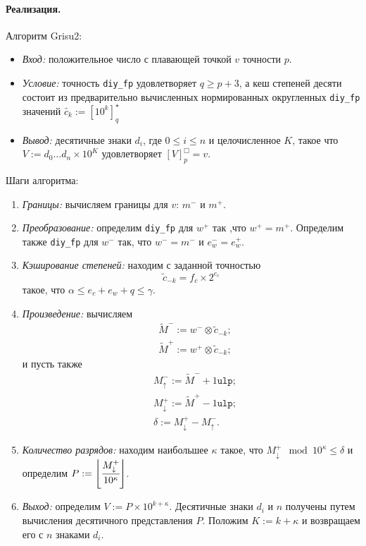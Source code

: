 \documentclass[specialist,subf,href,colorlinks=true,14pt
,times,mtpro,specialist
]{disser}
\begin{document}
\paragraph{Реализация.}
Алгоритм \textsf{Grisu2}: \begin{itemize}
\item \textit{Вход:} положительное число с плавающей точкой $v$ точности $p$.
\item \textit{Условие:} точность \texttt{diy\_fp} удовлетворяет $q \geqslant p + 3$, а кеш степеней десяти состоит из предварительно вычисленных нормированных округленных  \texttt{diy\_fp} значений $\tilde{c_k} := \left[ 10^k \right]_q^{\star}$
\item \textit{Вывод:} десятичные знаки $d_i$, где $0 \leqslant i \leqslant n$ и целочисленное $K$, такое что $V:=d_0\dots d_n \times 10 ^K$ удовлетворяет $[V]^{\Box}_p = v$. 
\end{itemize}

Шаги алгоритма:
\begin{enumerate}
\item \textit{Границы:} вычисляем границы для $v$: $m^{-}$ и $m^{+}$. 
\item \textit{Преобразование:} определим \texttt{diy\_fp} для $w^+$ так ,что $w^+ = m^+$. 
Определим также \texttt{diy\_fp} для $w^-$ так, что $w^{-} = m^-$ и $e_w^- = e_w^+$.
\item \textit{Кэширование степеней:} находим с заданной точностью $$\tilde{c}_{-k} = f_c \times 2^{e_c}$$ такое, что $\alpha \leqslant e_c + e_w + q \leqslant \gamma$.
\item \textit{Произведение:} вычисляем \begin{align*}
&\tilde{M}^- := w^- \otimes \tilde{c}_{-k}; \\
&\tilde{M}^+ := w^+ \otimes \tilde{c}_{-k};
\end{align*}и пусть также \begin{align*} & M_\uparrow^- := \tilde{M}^- + 1 \texttt{ulp};\\
& M_\downarrow^+ := \tilde{M}^+ - 1 \texttt{ulp};\\
& \delta := M_\downarrow^+ - M_\uparrow^-.
\end{align*}
\item \textit{Количество разрядов:} находим наибольшее $\kappa$ такое, что $M_\downarrow^+ \mod 10^\kappa \leqslant \delta$ и определим $P:= \left\lfloor \cfrac{M_\downarrow^+}{10^\kappa} \right\rfloor$.
\item \textit{Выход:} определим $V:= P \times 10^{k + \kappa}$. 
Десятичные знаки $d_i$ и $n$ получены путем вычисления десятичного представления $P$.
Положим $K:=k+\kappa$ и возвращаем его с $n$ знаками $d_i$.
\end{enumerate}
\end{document}
